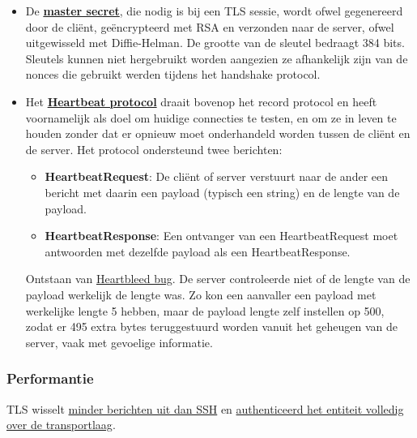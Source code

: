 \documentclass{report}
\begin{document}
\begin{itemize}
\begin{itemize}
		\end{itemize}
	De TLS record header heeft volgende structuur (figuur \ref{fig:tls_record_header}):
	\begin{figure}[ht]
		\texttt{[image: tls\_record\_header]}
		\caption{De TLS record header.}
		\label{fig:tls_record_header}
	\end{figure}
	\begin{itemize}
		\item 1 byte voor het contenttype. Dit is het applicatielaagprotocol dat gebruikt wordt.
		\item 2 bytes voor de versie (voor TLS 1.2 heeft dit de waarden 3 en 3).
		\item Lengte van de informatie.
	\end{itemize}

	\item De \underline{\textbf{master secret}}, die nodig is bij een TLS sessie, wordt ofwel gegenereerd door de cliënt, geëncrypteerd met RSA en verzonden naar de server, ofwel uitgewisseld met Diffie-Helman. De grootte van de sleutel bedraagt 384 bits. Sleutels kunnen niet hergebruikt worden aangezien ze afhankelijk zijn van de nonces die gebruikt werden tijdens het handshake protocol.
	\item Het \underline{\textbf{Heartbeat protocol}} draait bovenop het record protocol en heeft voornamelijk als doel om huidige connecties te testen, en om ze in leven te houden zonder dat er opnieuw moet onderhandeld worden tussen de cliënt en de server. Het protocol ondersteund twee berichten:
		\begin{itemize}
			\item \textbf{HeartbeatRequest}: De cliënt of server verstuurt naar de ander een bericht met daarin een payload (typisch een string) en de lengte van de payload. 
			\item \textbf{HeartbeatResponse}: Een ontvanger van een HeartbeatRequest moet antwoorden met dezelfde payload als een HeartbeatResponse.
		\end{itemize}
	Ontstaan van \underline{Heartbleed bug}. De server controleerde niet of de lengte van de payload werkelijk de lengte was. Zo kon een aanvaller een payload met werkelijke lengte 5 hebben, maar de payload lengte zelf instellen op 500, zodat er 495 extra bytes teruggestuurd worden vanuit het geheugen van de server, vaak met gevoelige informatie.
\end{itemize}

	\subsubsection{Performantie}
	TLS wisselt \underline{minder berichten uit dan SSH} en \underline{authenticeerd het entiteit volledig over de transportlaag}. 
\end{document}
